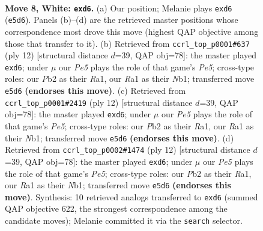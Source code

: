 \documentclass[11pt]{article}
\begin{document}
\begin{figure}[p]\centering
\begin{subfigure}{0.46\textwidth}\centering
\resizebox{\linewidth}{!}{%
\newchessgame
\chessboard[
  setfen={rnbqk2r/ppp1ppb1/1n1p2p1/4P2p/3P4/1B3N2/PPP2PPP/RNBQK1R1 w Qkq - 0 8},
  showmover=false,
  pgfstyle=straightmove, color=movearrow, markmove={e5-d6}
]}
\caption{}
\end{subfigure}\hfill
\begin{subfigure}{0.46\textwidth}\centering
\resizebox{\linewidth}{!}{%
\newchessgame
\chessboard[
  setfen={rnbqk2r/ppp1ppbp/1n1p2p1/4P3/2PP4/5N2/PP2BPPP/RNBQK2R w KQkq - 1 7},
  showmover=false,
  pgfstyle=straightmove, color=movearrow, markmove={e5-d6}
]}
\caption{}
\end{subfigure}
\\[4pt]
\begin{subfigure}{0.46\textwidth}\centering
\resizebox{\linewidth}{!}{%
\newchessgame
\chessboard[
  setfen={rnbqk2r/ppp1ppbp/1n1p2p1/4P3/2PP4/5N2/PP2BPPP/RNBQK2R w KQkq - 1 7},
  showmover=false,
  pgfstyle=straightmove, color=movearrow, markmove={e5-d6}
]}
\caption{}
\end{subfigure}\hfill
\begin{subfigure}{0.46\textwidth}\centering
\resizebox{\linewidth}{!}{%
\newchessgame
\chessboard[
  setfen={rnbqk2r/ppp1ppbp/1n1p2p1/4P3/2PP4/5N2/PP2BPPP/RNBQK2R w KQkq - 3 7},
  showmover=false,
  pgfstyle=straightmove, color=movearrow, markmove={e5-d6}
]}
\caption{}
\end{subfigure}
\caption{\textbf{Move 8, White: \texttt{exd6}.} (a) Our position; Melanie plays \texttt{exd6} (\texttt{e5d6}). Panels (b)--(d) are the retrieved master positions whose correspondence most drove this move (highest QAP objective among those that transfer to it). (b) Retrieved from \texttt{ccrl\_top\_p0001\#637} (ply 12) [structural distance $d$=39, QAP obj=78]: the master played \texttt{exd6}; under $\mu$ our \emph{Pe5} plays the role of that game's \emph{Pe5}; cross-type roles: our \emph{P}b2 as their \emph{R}a1, our \emph{R}a1 as their \emph{N}b1; transferred move \texttt{e5d6} \textbf{(endorses this move)}. (c) Retrieved from \texttt{ccrl\_top\_p0001\#2419} (ply 12) [structural distance $d$=39, QAP obj=78]: the master played \texttt{exd6}; under $\mu$ our \emph{Pe5} plays the role of that game's \emph{Pe5}; cross-type roles: our \emph{P}b2 as their \emph{R}a1, our \emph{R}a1 as their \emph{N}b1; transferred move \texttt{e5d6} \textbf{(endorses this move)}. (d) Retrieved from \texttt{ccrl\_top\_p0002\#1474} (ply 12) [structural distance $d$=39, QAP obj=78]: the master played \texttt{exd6}; under $\mu$ our \emph{Pe5} plays the role of that game's \emph{Pe5}; cross-type roles: our \emph{P}b2 as their \emph{R}a1, our \emph{R}a1 as their \emph{N}b1; transferred move \texttt{e5d6} \textbf{(endorses this move)}. Synthesis: 10 retrieved analogs transferred to \texttt{exd6} (summed QAP objective 622, the strongest correspondence among the candidate moves); Melanie committed it via the \texttt{search} selector.}
\label{fig:thought-m14}
\end{figure}
\end{document}
